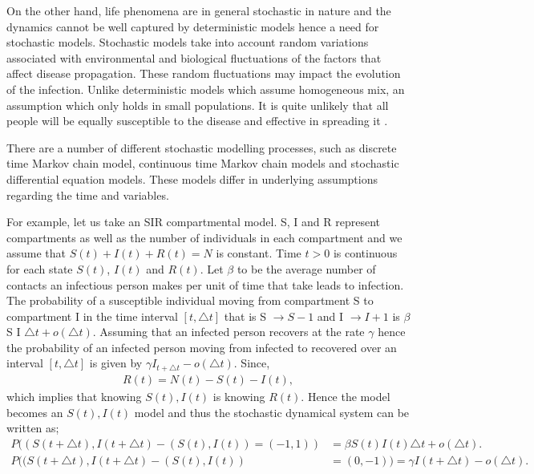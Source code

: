 On the other hand, life phenomena are in general stochastic in nature and the dynamics cannot be well captured by deterministic models hence a need
for stochastic models. Stochastic models take into account random variations associated with environmental and biological fluctuations of the factors that affect disease propagation. These random fluctuations may impact the evolution of the infection. Unlike deterministic models which assume homogeneous mix, an assumption which only holds in small populations. It is quite unlikely that all people will be equally susceptible to the disease and effective in spreading it \citep{ball1985deterministic}.

  There are a number of different stochastic modelling processes, such as discrete time Markov chain model, continuous time Markov chain models and stochastic differential equation models. These models differ in underlying assumptions regarding the time and variables.
 
  For example, let us take an SIR compartmental model. S, I and R represent compartments as well as the number of individuals in each compartment and we assume that $S (t) + I (t) + R (t) = N $ is constant. Time $t>0$ is continuous for each state $S (t) $, $I (t) $ and $R (t) $.
  Let $\beta$ to be the average number of contacts an infectious person makes per unit of time that take leads to infection. The probability of a susceptible individual moving from compartment S to compartment I in the time interval $\left[ t,\triangle t \right]$ that is S $\rightarrow S-1$ and I $\rightarrow I + 1 $ is $ \beta$ S I $ \triangle t + o (\triangle t) $.
  Assuming that an infected person recovers at the rate $\gamma$ hence the probability of an infected person moving from infected to recovered over an interval $\left[ t,\triangle t \right]$  is given by $\gamma I_ {t + \triangle t} -o (\triangle t) $. Since,
 \begin{align*}
  R(t) = N(t) - S(t) - I(t),
\end{align*}  
which implies that knowing $S(t),I(t)$ is knowing $R(t)$. Hence the model becomes an $S(t),I(t)$ model and thus the stochastic dynamical system can be written as;
 \begin{align}
 P((S(t + \triangle t), I(t + \triangle t) - (S(t) ,I(t)) = (-1,1)) &=  \beta S(t) I(t)  \triangle t + o (\triangle t).
 \\ P ((S(t + \triangle t), I(t + \triangle t) - (S(t) ,I(t)) &= ( 0,-1)) = \gamma I(t + \triangle t) -o (\triangle t).
 \end{align} 
 
